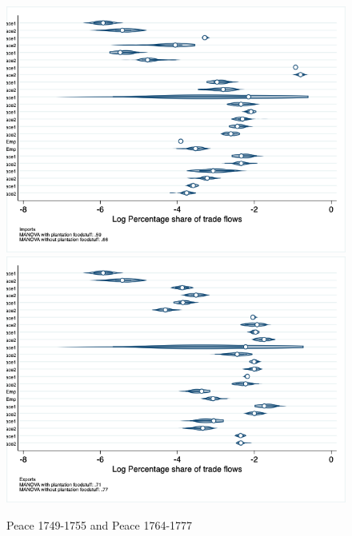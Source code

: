 \documentclass[12pt,a4paper,notitlepage,english]{article}
\begin{document}
\begin{figure}
\centering
\caption{Peace 1749-1755 and Peace 1764-1777}
\label{seven_peace1764_1777_nat_distr}
\includegraphics[scale=.4]{peace1749_1755_peace1764_1777_nat_distr_Ipays}
\includegraphics[scale=.4]{peace1749_1755_peace1764_1777_nat_distr_Xpays}
\end{figure}
\end{document}
